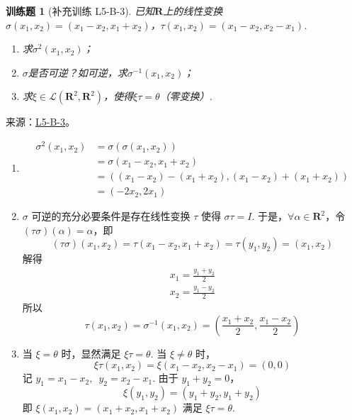 \documentclass[12pt,fontset=fandol]{ctexart}
\newtheorem{exercise}{训练题}[section]
\begin{document}
\begin{exercise}[补充训练 L5-B-3]\label{prob:L5-B-3}
已知$\mathbf{R}$上的线性变换$\sigma(x_1,x_2)=(x_1-x_2,x_1+x_2)$，$\tau(x_1,x_2)=(x_1-x_2,x_2-x_1)$.
        \begin{enumerate}
            \item 求$\sigma^2(x_1,x_2)$；

            \item $\sigma$是否可逆？如可逆，求$\sigma^{-1}(x_1,x_2)$；

            \item 求$\xi\in \mathcal{L}(\mathbf{R}^2,\mathbf{R}^2)$，使得$\xi\tau=\theta$（零变换）.
        \end{enumerate}
\end{exercise}
\noindent 来源：\href{https://github.com/yhwu-is/Linear-Algebra-Left-Undone/blob/new/%E8%AE%B2%E4%B9%89/%E4%B8%93%E9%A2%98/5%20%E7%BA%BF%E6%80%A7%E6%98%A0%E5%B0%84.tex}{L5-B-3}。
\begin{solve}
\begin{enumerate}
                \item \begin{align*}
                          \sigma^2(x_1, x_2) & = \sigma(\sigma(x_1, x_2))                               \\
                                             & = \sigma(x_1 - x_2, x_1 + x_2)                           \\
                                             & = ((x_1 - x_2) - (x_1 + x_2), (x_1 - x_2) + (x_1 + x_2)) \\
                                             & = (-2 x_2, 2 x_1)
                      \end{align*}

                \item $ \sigma $ 可逆的充分必要条件是存在线性变换 $ \tau $ 使得 $ \sigma \tau = I $. 于是，$ \forall \alpha \in \mathbf{R}^2 $，令 $ (\tau \sigma)(\alpha) = \alpha $，即
                      \[ (\tau \sigma)(x_1, x_2) = \tau(x_1 - x_2, x_1 + x_2) = \tau(y_1, y_2) = (x_1, x_2) \]
                      解得
                      \begin{gather*}
                          x_1 = \frac{y_1 + y_2}{2} \\
                          x_2 = \frac{y_1 - y_2}{2}
                      \end{gather*}
                      所以
                      \[ \tau(x_1, x_2) = \sigma^{-1}(x_1, x_2) = \left(\frac{x_1 + x_2}{2}, \frac{x_1 - x_2}{2}\right) \]

                \item 当 $ \xi = \theta $ 时，显然满足 $ \xi \tau = \theta $. 当 $ \xi \neq \theta $ 时，
                      \[ \xi \tau(x_1, x_2) = \xi(x_1 - x_2, x_2 - x_1) = (0, 0) \]
                      记 $ y_1 = x_1 - x_2,\enspace y_2 = x_2 - x_1 $. 由于 $ y_1 + y_2 = 0 $，
                      \[ \xi(y_1, y_2) = (y_1 + y_2, y_1 + y_2) \]
                      即 $ \xi(x_1, x_2) = (x_1 + x_2, x_1 + x_2) $ 满足 $ \xi \tau = \theta $.
            \end{enumerate}
\end{solve}
\end{document}
